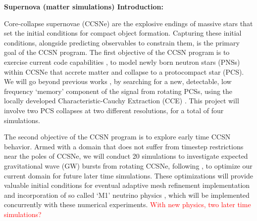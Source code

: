 \documentclass[12pt]{article}
\begin{document}
\setcounter{page}{1}  \renewcommand{\thepage}
           {\arabic{page} }%




\textbf{Supernova (matter simulations) Introduction: }

Core-collapse supernovae (CCSNe) are the explosive endings of massive stars that set the initial conditions for compact object formation.  Capturing these initial conditions, alongside predicting observables to constrain them, is the primary goal of the CCSN program.  The first objective of the CCSN program is to exercise current code capabilities \citep{legred:2023}, to model newly born neutron stars (PNSs) within CCSNe that accrete matter and collapse to a protocompact star (PCS).  We will go beyond previous works \citep{zha:2020}, by searching for a new, detectable, low frequency `memory' component of the signal from rotating PCSs, using the locally developed Characteristic-Cauchy Extraction (CCE) \citep{moxon:2021}.  This project will involve two PCS collapses at two different resolutions, for a total of four simulations.

The second objective of the CCSN program is to explore early time CCSN behavior.  Armed with a domain that does not suffer from timestep restrictions near the poles of CCSNe, we will conduct 20 simulations to investigate expected gravitational wave (GW) bursts from rotating CCSNe, following \citep{dimmelmeier:2001}, to optimize our current domain for future later time simulations.  These optimizations will provide valuable initial conditions for eventual adaptive mesh refinement implementation and incorporation of so called `M1' neutrino physics \citep{shibata:2011}, which will be implemented concurrently with these numerical experiments.  \textcolor{red}{With new physics, two later time simulations?}
\end{document}
